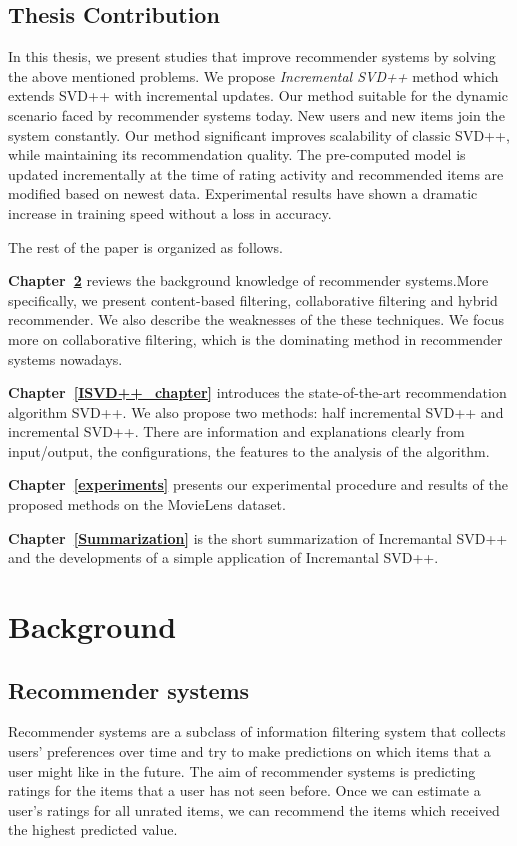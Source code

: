 \documentclass[oneside,13pt]{extreport}
\begin{document}
\section{Thesis Contribution}
In this thesis, we present studies that improve recommender systems by solving the above mentioned problems. We propose \emph{Incremental SVD++} method which extends SVD++ with incremental updates. Our method suitable for the dynamic scenario faced by recommender systems today. New users and new items join the system constantly. Our method significant improves scalability of classic SVD++, while maintaining its recommendation quality. The pre-computed model is updated incrementally at the time of rating activity and recommended items are modified based on newest data. Experimental results have shown a dramatic increase in training speed without a loss in accuracy.

The rest of the paper is organized as follows.
\begin{description}
    \item{\textbf{Chapter~\ref{backgroud_chapter}}} reviews the background knowledge of recommender systems.More specifically, we present content-based filtering, collaborative filtering and hybrid recommender. We also describe the weaknesses of the these techniques. We focus more on collaborative filtering, which is the dominating method in recommender systems nowadays.
    \item{\textbf{Chapter~\ref{ISVD++_chapter}}} introduces the state-of-the-art recommendation algorithm SVD++. We also propose two methods: half incremental SVD++ and incremental SVD++. There are information and explanations clearly from input/output, the configurations, the features to the analysis of the algorithm.
	\item{\textbf{Chapter~\ref{experiments}}} presents our experimental procedure and results of the proposed methods on the MovieLens dataset. 
    \item{\textbf{Chapter~\ref{Summarization}}} is the short summarization of Incremantal SVD++ and the developments of a simple application of Incremantal SVD++.
    
\end{description}

\chapter{Background}
\label{backgroud_chapter}
\section{Recommender systems}
Recommender systems are a subclass of information filtering system that collects users’ preferences over time and try to make predictions on which items that a user might like in the future. The aim of recommender systems is predicting ratings for the items that a user has not seen before. Once we can estimate a user's ratings for all unrated items, we can recommend the items which received the highest predicted value.
\end{document}
